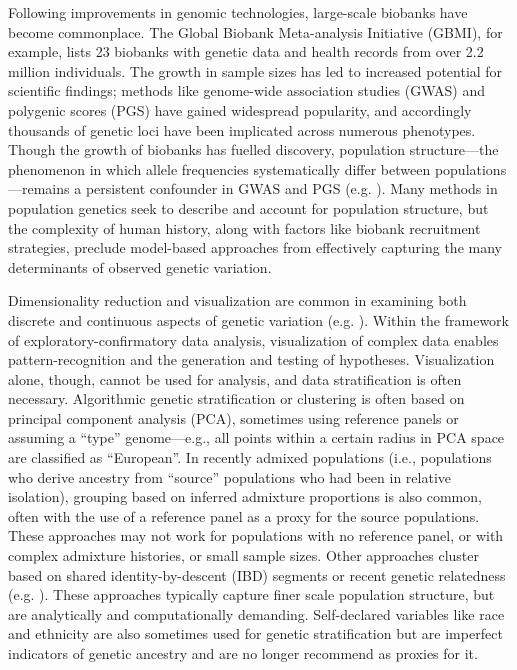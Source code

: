 Following improvements in genomic technologies, large-scale biobanks have become commonplace. The ﻿Global Biobank Meta-analysis Initiative (GBMI), for example, lists 23 biobanks with genetic data and health records from over 2.2 million individuals﻿\cite{zhou_global_2022}. The growth in sample sizes has led to increased potential for scientific findings; methods like genome-wide association studies (GWAS) and polygenic scores (PGS) have gained widespread popularity, and accordingly thousands of genetic loci have been implicated across numerous phenotypes. Though the growth of biobanks has fuelled discovery, population structure---the  phenomenon in which allele frequencies systematically differ between populations---remains a persistent confounder in GWAS and PGS (e.g. \cite{sakaue_dimensionality_2020,zaidi_demographic_2020}). Many methods in population genetics seek to describe and account for population structure, but the complexity of human history, along with factors like biobank recruitment strategies, preclude model-based approaches from effectively capturing the many determinants of observed genetic variation.

Dimensionality reduction and visualization are common in examining both discrete and continuous aspects of genetic variation (e.g. \cite{diaz-papkovich_umap_2019,battey_visualizing_2021}). Within the framework of exploratory-confirmatory data analysis, visualization of complex data enables pattern-recognition and the generation and testing of hypotheses\cite{holmes_modern_2019}. Visualization alone, though, cannot be used for analysis, and data stratification is often necessary. Algorithmic genetic stratification or clustering is often based on principal component analysis (PCA), sometimes using reference panels or assuming a ``type'' genome---e.g., all points within a certain radius in PCA space are classified as ``European''.  In recently admixed populations (i.e., populations who derive ancestry from ``source'' populations who had been in relative isolation), grouping based on inferred admixture proportions is also common, often with the use of a reference panel as a proxy for the source populations. These approaches may not work for populations with no reference panel, or with complex admixture histories, or small sample sizes\citep{ding_polygenic_2023}. Other approaches cluster based on shared identity-by-descent (IBD) segments or recent genetic relatedness (e.g. \citep{freyman_fast_2021,shemirani_rapid_2021}). These approaches typically capture finer scale population structure, but are analytically and computationally demanding. Self-declared variables like race and ethnicity are also sometimes used for genetic stratification but are imperfect indicators of genetic ancestry and are no longer recommend as proxies for it\citep{committee_2023, kaseniit_genetic_2020}.

